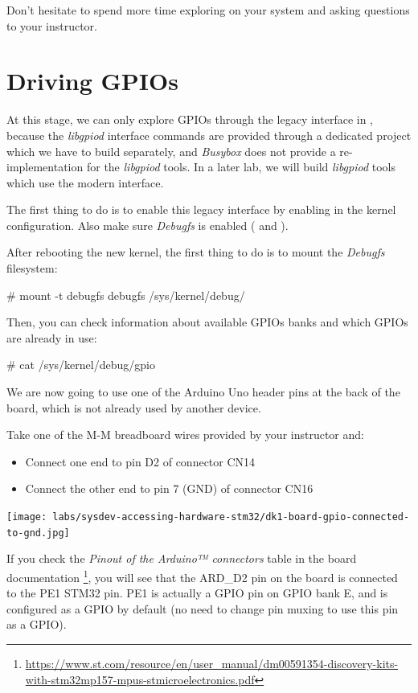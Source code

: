 Don't hesitate to spend more time exploring  on your system
and asking questions to your instructor.

\section{Driving GPIOs}

At this stage, we can only explore GPIOs through the legacy interface
in , because the {\em libgpiod} interface
commands are provided through a dedicated project which we have to
build separately, and {\em Busybox} does not provide a
re-implementation for the {\em libgpiod} tools. In a later lab, we
will build {\em libgpiod} tools which use the modern
 interface.

The first thing to do is to enable this legacy interface by enabling
 in the kernel configuration. Also make sure
{\em Debugfs} is enabled ( and
).

After rebooting the new kernel, the first thing to do is to mount
the {\em Debugfs} filesystem:

\begin{bashinput}
# mount -t debugfs debugfs /sys/kernel/debug/
\end{bashinput}

Then, you can check information about available GPIOs banks and which
GPIOs are already in use:

\begin{bashinput}
# cat /sys/kernel/debug/gpio
\end{bashinput}

\if{}
      We are now going to use one of the Arduino Uno header pins at the back
      of the board, which is not already used by another device.

      Take one of the M-M breadboard wires provided by your instructor and:
      \begin{itemize}
      \item Connect one end to pin D2 of connector CN14
      \item Connect the other end to pin 7 (GND) of connector CN16
      \end{itemize}

      \texttt{[image: labs/sysdev-accessing-hardware-stm32/dk1-board-gpio-connected-to-gnd.jpg]}

      If you check the {\em Pinout of the Arduino™ connectors} table in the board
      documentation
      \footnote{\url{https://www.st.com/resource/en/user_manual/dm00591354-discovery-kits-with-stm32mp157-mpus-stmicroelectronics.pdf}},
      you will see that the ARD\_D2 pin on the board is connected to the PE1
      STM32 pin. PE1 is actually a GPIO pin on GPIO bank E, and is configured
      as a GPIO by default (no need to change pin muxing to use this pin as
      a GPIO).

